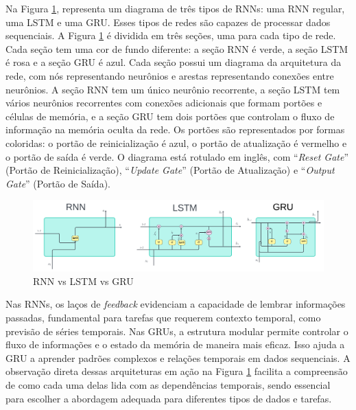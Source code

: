 Na Figura \ref{fig:rnn-vs-lstm-vs-gru-1024x308}, representa um diagrama de três tipos de RNNs: uma RNN regular, uma LSTM e uma GRU. Esses tipos de redes são capazes de processar dados sequenciais. A  Figura \ref{fig:rnn-vs-lstm-vs-gru-1024x308} é dividida em três seções, uma para cada tipo de rede. Cada seção tem uma cor de fundo diferente: a seção RNN é verde, a seção LSTM é rosa e a seção GRU é azul. Cada seção possui um diagrama da arquitetura da rede, com nós representando neurônios e arestas representando conexões entre neurônios. A seção RNN tem um único neurônio recorrente, a seção LSTM tem vários neurônios recorrentes com conexões adicionais que formam portões e células de memória, e a seção GRU tem dois portões que controlam o fluxo de informação na memória oculta da rede. Os portões são representados por formas coloridas: o portão de reinicialização é azul, o portão de atualização é vermelho e o portão de saída é verde. O diagrama está rotulado em inglês, com ``\textit{Reset Gate}'' (Portão de Reinicialização), ``\textit{Update Gate}'' (Portão de Atualização) e ``\textit{Output Gate}'' (Portão de Saída). 

\begin{figure}[!htb]
	\centering
	\caption{RNN vs LSTM vs GRU}
	\label{fig:rnn-vs-lstm-vs-gru-1024x308}
	\includegraphics[width=\linewidth]{Apendices/Figuras/modelagem-24h/RNN-vs-LSTM-vs-GRU-1024x308}
	
\end{figure}


Nas RNNs, os laços de \textit{feedback} evidenciam a capacidade de lembrar informações passadas, fundamental para tarefas que requerem contexto temporal, como previsão de séries temporais.
Nas GRUs, a estrutura modular permite controlar o fluxo de informações e o estado da memória de maneira mais eficaz. Isso ajuda a GRU a aprender padrões complexos e relações temporais em dados sequenciais.
A observação direta dessas arquiteturas em ação na Figura \ref{fig:rnn-vs-lstm-vs-gru-1024x308} facilita a compreensão de como cada uma delas lida com as dependências temporais, sendo essencial para escolher a abordagem adequada para diferentes tipos de dados e tarefas.

